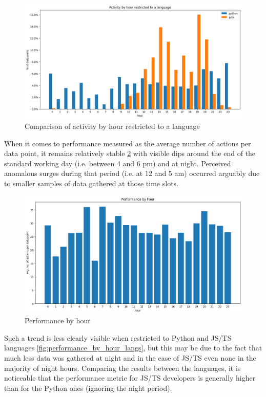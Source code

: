 \begin{figure}[htbp]
  \centering
  \includegraphics[scale=0.5]{chapters/results/graphics/activity-by-hour-langs.png}
  \caption{Comparison of activity by hour restricted to a language}
  \label{fig:activity_by_hour_langs}
\end{figure}

When it comes to performance measured as the average number of actions per data point, it remains relatively stable \ref{fig:performance_by_hour} with visible dips around the end of the standard working day (i.e. between 4 and 6 pm) and at night. Perceived anomalous surges during that period (i.e. at 12 and 5 am) occurred arguably due to smaller samples of data gathered at those time slots.

\begin{figure}[htbp]
  \centering
  \includegraphics[scale=0.5]{chapters/results/graphics/performance-by-hour.png}
  \caption{Performance by hour}
  \label{fig:performance_by_hour}
\end{figure}

Such a trend is less clearly visible when restricted to Python and JS/TS languages \ref{fig:performance_by_hour_langs}, but this may be due to the fact that much less data was gathered at night and in the case of JS/TS even none in the majority of night hours. Comparing the results between the languages, it is noticeable that the performance metric for JS/TS developers is generally higher than for the Python ones (ignoring the night period).

